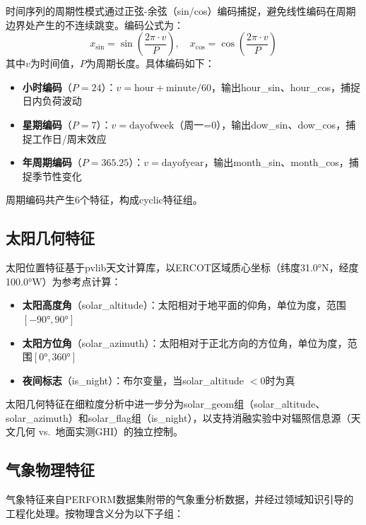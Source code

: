 时间序列的周期性模式通过正弦-余弦（sin/cos）编码捕捉，避免线性编码在周期边界处产生的不连续跳变\cite{vaswani2017attention}。编码公式为：
\begin{equation}
x_{\sin} = \sin\left(\frac{2\pi \cdot v}{P}\right), \quad x_{\cos} = \cos\left(\frac{2\pi \cdot v}{P}\right)
\end{equation}
其中$v$为时间值，$P$为周期长度。具体编码如下：

\begin{itemize}
  \item \textbf{小时编码}（$P=24$）：$v = \text{hour} + \text{minute}/60$，输出hour\_sin、hour\_cos，捕捉日内负荷波动
  \item \textbf{星期编码}（$P=7$）：$v = \text{dayofweek}$（周一=0），输出dow\_sin、dow\_cos，捕捉工作日/周末效应
  \item \textbf{年周期编码}（$P=365.25$）：$v = \text{dayofyear}$，输出month\_sin、month\_cos，捕捉季节性变化
\end{itemize}

周期编码共产生6个特征，构成cyclic特征组。

\subsection{太阳几何特征}

太阳位置特征基于pvlib天文计算库\cite{pvlib2018}，以ERCOT区域质心坐标（纬度31.0°N，经度100.0°W）为参考点计算：

\begin{itemize}
  \item \textbf{太阳高度角}（solar\_altitude）：太阳相对于地平面的仰角，单位为度，范围$[-90°, 90°]$
  \item \textbf{太阳方位角}（solar\_azimuth）：太阳相对于正北方向的方位角，单位为度，范围$[0°, 360°]$
  \item \textbf{夜间标志}（is\_night）：布尔变量，当solar\_altitude $< 0$时为真
\end{itemize}

太阳几何特征在细粒度分析中进一步分为solar\_geom组（solar\_altitude、solar\_azimuth）和solar\_flag组（is\_night），以支持消融实验中对辐照信息源（天文几何 vs.\ 地面实测GHI）的独立控制。

\subsection{气象物理特征}

气象特征来自PERFORM数据集附带的气象重分析数据，并经过领域知识引导的工程化处理。按物理含义分为以下子组：

